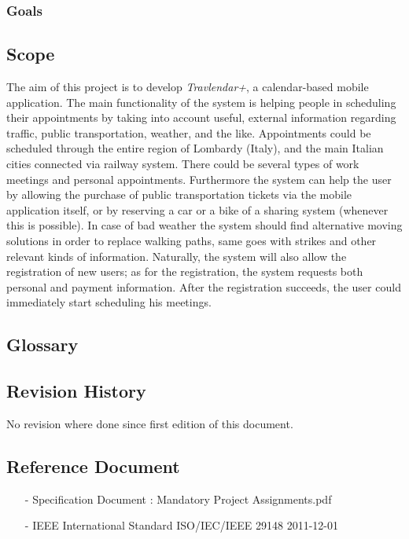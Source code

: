 \documentclass[12pt, a4paper]{article}
\begin{document}
		\subsubsection{Goals}
			
		
		\subsection{Scope}
		The aim of this project is to develop \textit{Travlendar+}, a calendar-based mobile application. 
		The main functionality of the system is helping people in scheduling their appointments by taking into account useful, external information regarding traffic, public transportation, weather, and the like. 
		Appointments could be scheduled through the entire region of Lombardy (Italy), and the main Italian cities connected via railway system. There could be several types of work meetings and personal appointments.
		Furthermore the system can help the user by allowing the purchase of public transportation tickets via the mobile application itself, or by reserving a car or a bike of a sharing system (whenever this is possible). In case of bad weather the system should find alternative moving solutions in order to replace walking paths, same goes with strikes and other relevant kinds of information. 
		Naturally, the system will also allow the registration of new users; as for the registration, the system requests both personal and payment information. After the registration succeeds, the user could immediately start scheduling his meetings.
		
		\subsection{Glossary}
			
		
		\subsection{Revision History}
			No revision where done since first edition of this document.
			
		\subsection{Reference Document}
			\begin{itemize}
				\item[-] \textsf{Specification Document : Mandatory Project Assignments.pdf}
				\item[-] \textsf{IEEE International Standard ISO/IEC/IEEE 29148 2011-12-01}
			\end{itemize}
		
\end{document}
